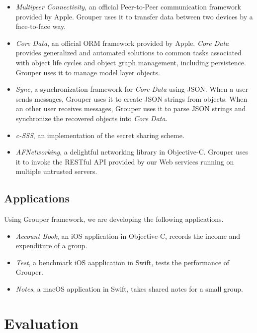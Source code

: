 \documentclass[twocolumn,10pt]{article}
\begin{document}
\begin{itemize}
	\setlength{\itemsep}{1pt}
	\setlength{\parskip}{0pt}
	\setlength{\parsep}{0pt}
	\item 
	\emph{Multipeer Connectivity}\cite{mc},  an official Peer-to-Peer communication framework provided by Apple. 
	Grouper uses it to transfer data between two devices by a face-to-face way.
	\item 
	\emph{Core Data}\cite{coredata}, an official ORM framework provided by Apple.
	\emph{Core Data} provides generalized and automated solutions to common tasks associated with object life cycles and object graph management, including persistence. 
	Grouper uses it to manage model layer objects. 
	\item 
	\emph{Sync}\cite{sync}, a synchronization framework for \emph{Core Data} using JSON. 
	When a user sends messages, Grouper uses it to create JSON strings from objects. 
	When an other user receives messages, Grouper uses it to parse JSON strings and synchronize the recovered objects into \emph{Core Data}.
	\item 
	\emph{c-SSS}\cite{c-sss}, an implementation of the secret sharing scheme.
	\item 
	\emph{AFNetworking}\cite{afnetworking}, a delightful networking library in Objective-C. 
	Grouper uses it to invoke the RESTful API provided by our Web services running on multiple untrusted servers. 
\end{itemize}

\subsection{Applications}

Using Grouper framework, we are developing the following applications. 

\begin{itemize}
	\setlength{\itemsep}{1pt}
	\setlength{\parskip}{0pt}
	\setlength{\parsep}{0pt}
	\item \emph{Account Book}, an iOS application in Objective-C, records the income and expenditure of a group.
	\item \emph{Test}, a benchmark iOS aapplication in Swift, tests the performance of Grouper.
	\item \emph{Notes}, a macOS application in Swift, takes shared notes for a small group.
\end{itemize}

\section{Evaluation}
\end{document}
